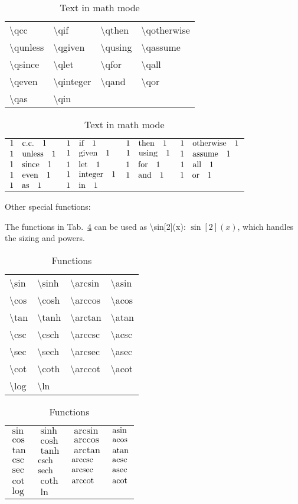 \documentclass{article}
\def\tbs{\textbackslash}
\begin{document}
\begin{table}[hpb]
    \caption{Text in math mode}\label{tab:text}
    \centering
    \begin{tabular}{llll}
    \tbs qcc & \tbs qif & \tbs qthen & \tbs qotherwise \\
    \tbs qunless & \tbs qgiven & \tbs qusing & \tbs qassume \\
    \tbs qsince & \tbs qlet & \tbs qfor & \tbs qall \\
    \tbs qeven & \tbs qinteger & \tbs qand & \tbs qor \\
    \tbs qas & \tbs qin
    \end{tabular}
    \begin{tabular}{|llll}
    $1\qcc1$ & $1\qif1$ & $1\qthen1$ & $1\qotherwise1$ \\
    $1\qunless1$ & $1\qgiven1$ & $1\qusing1$ & $1\qassume1$ \\
    $1\qsince1$ & $1\qlet1$ & $1\qfor1$ & $1\qall1$ \\
    $1\qeven1$ & $1\qinteger1$ & $1\qand1$ & $1\qor1$ \\
    $1\qas1$ & $1\qin1$
    \end{tabular}
\end{table}

Other special functions:

The functions in Tab.~\ref{tab:func} can be used as \tbs sin[2](x):
$\sin[2](x)$, which handles the sizing and powers.
\begin{table}[hpb]
    \caption{Functions}\label{tab:func}
\centering
\begin{tabular}{llll}
\tbs sin & \tbs sinh & \tbs arcsin & \tbs asin \\
\tbs cos & \tbs cosh & \tbs arccos & \tbs acos \\
\tbs tan & \tbs tanh & \tbs arctan & \tbs atan \\
\tbs csc & \tbs csch & \tbs arccsc & \tbs acsc \\
\tbs sec & \tbs sech & \tbs arcsec & \tbs asec \\
\tbs cot & \tbs coth & \tbs arccot & \tbs acot \\
\tbs log & \tbs ln
\end{tabular}
\begin{tabular}{|llll}
$\sin$ & $\sinh$ & $\arcsin$ & $\asin$ \\
$\cos$ & $\cosh$ & $\arccos$ & $\acos$ \\
$\tan$ & $\tanh$ & $\arctan$ & $\atan$ \\
$\csc$ & $\csch$ & $\arccsc$ & $\acsc$ \\
$\sec$ & $\sech$ & $\arcsec$ & $\asec$ \\
$\cot$ & $\coth$ & $\arccot$ & $\acot$ \\
$\log$ &$ \ln$
\end{tabular}
\end{table}
\end{document}
